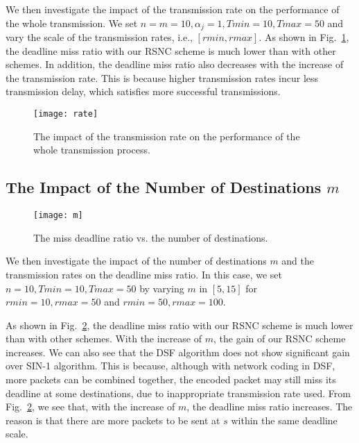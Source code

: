 \documentclass[journal]{IEEEtran}
\begin{document}
We then investigate the impact of the transmission rate on the performance of the whole transmission. We set $n=m=10,\alpha_j=1,Tmin=10,Tmax=50$ and vary the scale of the transmission rates, i.e., $[rmin, rmax]$. As shown in Fig.~\ref{sim.rate}, the deadline miss ratio with our RSNC scheme is much lower than with other schemes. In addition, the deadline miss ratio also decreases with the increase of the transmission rate. This is because higher transmission rates incur less transmission delay, which satisfies more successful transmissions.
\begin{figure}[t]
\begin{center}\vspace{-0.07in}
\texttt{[image: rate]}\vspace{-0.1in}
\caption{The impact of the transmission rate on the performance of the whole transmission process.}\vspace{-0.15in} \label{sim.rate}
\end{center}\vspace{-0.05in}
\end{figure}

\vspace{-0.12in}
\subsection{The Impact of the Number of Destinations $m$}
\begin{figure}[t]
\begin{center}
\texttt{[image: m]}\vspace{-0.08in}
\caption{The miss deadline ratio vs. the number of destinations.}\vspace{-0.15in} \label{sim.m}
\end{center}\vspace{-0.08in}
\end{figure}

We then investigate the impact of the number of destinations $m$ and the transmission rates on the deadline miss ratio. In this case, we set $n=10,Tmin=10,Tmax=50$ by varying $m$ in $[5,15]$ for $rmin=10,rmax=50$ and $rmin=50,rmax=100$.

As shown in Fig.~\ref{sim.m}, the deadline miss ratio with our RSNC scheme is much lower than with other schemes. With the increase of $m$, the gain of our RSNC scheme increases. We can also see that the DSF algorithm does not show significant gain over SIN-1 algorithm. This is because, although with network coding in DSF, more packets can be combined together, the encoded packet may still miss its deadline at some destinations, due to inappropriate transmission rate used. From Fig.~\ref{sim.m}, we see that, with the increase of $m$, the deadline miss ratio increases. The reason is that there are more packets to be sent at $s$ within the same deadline scale.
\vspace{-0.12in}
\end{document}

